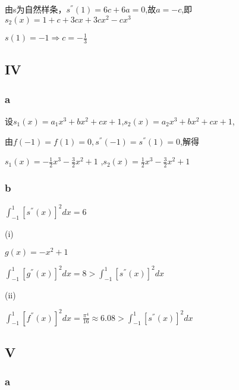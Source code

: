 \documentclass[12]{article}%
\begin{document}
            由s为自然样条，$s^{''}(1)=6c+6a=0$,故$a=-c$,即$s_2(x)=1+c+3cx+3cx^2-cx^3$

            $s(1)=-1 \Rightarrow c=-\frac{1}{3}$

        \subsection{IV}
            \subsubsection{a}
                设$s_1(x)=a_1x^3+bx^2+cx+1$,$s_2(x)=a_2x^3+bx^2+cx+1$,

                由$f(-1)=f(1)=0,s^{''}(-1)=s^{''}(1)=0$,解得

                $s_1(x)=-\frac{1}{2}x^3-\frac{3}{2}x^2+1$
                ,$s_2(x)=\frac{1}{2}x^3-\frac{3}{2}x^2+1$
                
            \subsubsection{b}
                $\int_{-1}^{1}[s^{''}(x)]^2dx=6$

                (i)

                $g(x)=-x^2+1$

                $\int_{-1}^1[g^{''}(x)]^2dx=8 > \int_{-1}^{1}[s^{''}(x)]^2dx$

                (ii)

                $\int_{-1}^1[f^{''}(x)]^2dx=\frac{\pi^4}{16} \approx 6.08 > \int_{-1}^{1}[s^{''}(x)]^2dx$

        \subsection{V}
            \subsubsection{a}
            
\end{document}
